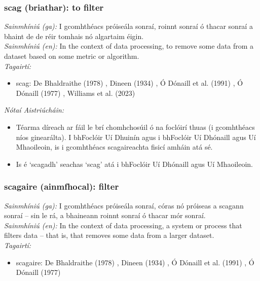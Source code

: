 \subsubsection*{scag (briathar): to filter}
 \noindent \textit{Sainmhíniú (ga):} I gcomhthéacs próiseála sonraí, roinnt sonraí ó thacar sonraí a bhaint de de réir tomhais nó algartaim éigin.
\\
 \noindent \textit{Sainmhíniú (en):} In the context of data processing, to remove some data from a dataset based on some metric or algorithm.
\\
 \noindent \textit{Tagairtí:}
\begin{itemize}
	\item scag: De Bhaldraithe (1978) \cite{de-bhaldraithe}, Dineen (1934) \cite{dineen}, Ó Dónaill et al. (1991) \cite{focloir-beag}, Ó Dónaill (1977) \cite{odonaill}, Williams et al. (2023) \cite{storchiste}
\end{itemize}

 \noindent \textit{Nótaí Aistriúcháin:}
\begin{itemize}
	\item Téarma díreach ar fáil le brí chomhchosúil ó na foclóirí thuas (i gcomhthéacs níos ginearálta). I bhFoclóir Uí Dhuinín agus i bhFoclóir Uí Dhónaill agus Uí Mhaoileoin, is i gcomhthéacs scagaireachta fisicí amháin atá sé.
	\item Is é `scagadh' seachas `scag' atá i bhFoclóir Uí Dhónaill agus Uí Mhaoileoin.
\end{itemize}


\subsubsection*{scagaire (ainmfhocal): filter}
 \noindent \textit{Sainmhíniú (ga):} I gcomhthéacs próiseála sonraí, córas nó próiseas a scagann sonraí -- sin le rá, a bhaineann roinnt sonraí ó thacar mór sonraí.
\\
 \noindent \textit{Sainmhíniú (en):} In the context of data processing, a system or process that filters data -- that is, that removes some data from a larger dataset.
\\
 \noindent \textit{Tagairtí:}
\begin{itemize}
	\item scagaire: De Bhaldraithe (1978) \cite{de-bhaldraithe}, Dineen (1934) \cite{dineen}, Ó Dónaill et al. (1991) \cite{focloir-beag}, Ó Dónaill (1977) \cite{odonaill}
\end{itemize}

